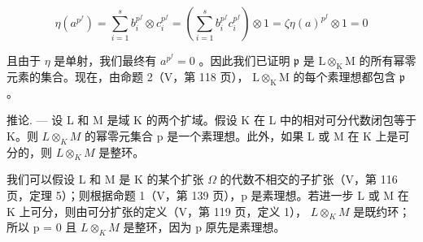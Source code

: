 \[
\eta \left(a ^ {p ^ {f}}\right) = \sum_ {i = 1} ^ {s} b _ {i} ^ {p ^ {f}} \otimes c _ {i} ^ {p ^ {f}} = \left(\sum_ {i = 1} ^ {s} b _ {i} ^ {p ^ {f}} c _ {i} ^ {p ^ {f}}\right) \otimes 1 = \zeta \eta (a) ^ {p ^ {f}} \otimes 1 = 0
\]

且由于 \(\eta\) 是单射，我们最终有 \(a^{p^{f}} = 0\) 。因此我们已证明 \(\mathfrak{p}\) 是 \(\mathrm{L} \otimes_{\mathrm{K}} \mathrm{M}\) 的所有幂零元素的集合。现在，由命题 2（V，第 118 页）， \(\mathrm{L} \otimes_{\mathrm{K}} \mathrm{M}\) 的每个素理想都包含 \(\mathfrak{p}\) 。

推论. --- 设 L 和 M 是域 K 的两个扩域。假设 K 在 L 中的相对可分代数闭包等于 K。则 \(L \otimes_{K} M\) 的幂零元集合 p 是一个素理想。此外，如果 L 或 M 在 K 上是可分的，则 \(L \otimes_{K} M\) 是整环。

我们可以假设 L 和 M 是 K 的某个扩张 \(\Omega\) 的代数不相交的子扩张（V，第 116 页，定理 5）；则根据命题 1（V，第 139 页），p 是素理想。若进一步 L 或 M 在 K 上可分，则由可分扩张的定义（V，第 119 页，定义 1）， \(L \otimes_{K} M\) 是既约环；所以 p = 0 且 \(L \otimes_{K} M\) 是整环，因为 p 原先是素理想。

